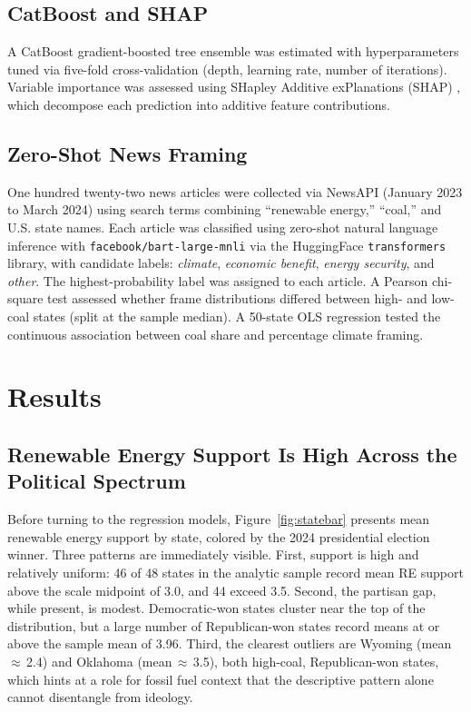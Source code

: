 \documentclass[9pt,twoside]{pnas-new}
\begin{document}
\subsection*{CatBoost and SHAP}
A CatBoost gradient-boosted tree ensemble \cite{Prokhorenkova2018} was estimated
with hyperparameters tuned via five-fold cross-validation (depth, learning rate,
number of iterations). Variable importance was assessed using SHapley Additive
exPlanations (SHAP) \cite{Lundberg2017}, which decompose each prediction into
additive feature contributions.

\subsection*{Zero-Shot News Framing}
One hundred twenty-two news articles were collected via NewsAPI
(January 2023 to March 2024) using search terms combining ``renewable energy,''
``coal,'' and U.S. state names. Each article was classified using zero-shot
natural language inference with \texttt{facebook/bart-large-mnli} \cite{Lewis2020}
via the HuggingFace \texttt{transformers} library, with candidate labels:
\textit{climate}, \textit{economic benefit}, \textit{energy security},
and \textit{other}. The highest-probability label was assigned to each article.
A Pearson chi-square test assessed whether frame distributions differed between
high- and low-coal states (split at the sample median). A 50-state OLS regression
tested the continuous association between coal share and percentage climate framing.

\Endparasplit

\section*{Results}

\subsection*{Renewable Energy Support Is High Across the Political Spectrum}

Before turning to the regression models, Figure~\ref{fig:statebar} presents mean
renewable energy support by state, colored by the 2024 presidential election
winner. Three patterns are immediately visible. First, support is high and
relatively uniform: 46 of 48 states in the analytic sample record mean RE support
above the scale midpoint of 3.0, and 44 exceed 3.5. Second, the partisan gap,
while present, is modest. Democratic-won states cluster near the top of the
distribution, but a large number of Republican-won states record means at or above
the sample mean of 3.96. Third, the clearest outliers are Wyoming (mean\,$\approx$\,2.4)
and Oklahoma (mean\,$\approx$\,3.5), both high-coal, Republican-won states, which
hints at a role for fossil fuel context that the descriptive pattern alone cannot
disentangle from ideology.
\end{document}
